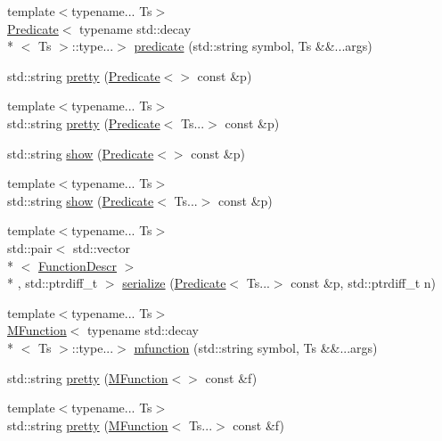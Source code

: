 \begin{DoxyCompactItemize}
\item 
{\footnotesize template$<$typename... Ts$>$ }\\\hyperlink{structpfq_1_1lang_1_1Predicate}{Predicate}$<$ typename std\+::decay\\*
$<$ Ts $>$\+::type...$>$ \hyperlink{namespacepfq_1_1lang_aca9adafc436b7f851621b979fa1aaf88}{predicate} (std\+::string symbol, Ts \&\&...args)
\item 
std\+::string \hyperlink{namespacepfq_1_1lang_a5bd21fba49ed1266540c831a9110fec6}{pretty} (\hyperlink{structpfq_1_1lang_1_1Predicate}{Predicate}$<$$>$ const \&p)
\item 
{\footnotesize template$<$typename... Ts$>$ }\\std\+::string \hyperlink{namespacepfq_1_1lang_a9593b1beab5ad5f2845f8ccb4d312fab}{pretty} (\hyperlink{structpfq_1_1lang_1_1Predicate}{Predicate}$<$ Ts...$>$ const \&p)
\item 
std\+::string \hyperlink{namespacepfq_1_1lang_aeb7cd494cccb45ea7a0a400a51811646}{show} (\hyperlink{structpfq_1_1lang_1_1Predicate}{Predicate}$<$$>$ const \&p)
\item 
{\footnotesize template$<$typename... Ts$>$ }\\std\+::string \hyperlink{namespacepfq_1_1lang_a667a4e63478d598e4fb2f73a2d503954}{show} (\hyperlink{structpfq_1_1lang_1_1Predicate}{Predicate}$<$ Ts...$>$ const \&p)
\item 
{\footnotesize template$<$typename... Ts$>$ }\\std\+::pair$<$ std\+::vector\\*
$<$ \hyperlink{structpfq_1_1lang_1_1FunctionDescr}{Function\+Descr} $>$\\*
, std\+::ptrdiff\+\_\+t $>$ \hyperlink{namespacepfq_1_1lang_a2e348096a954026da9afbc9cccb1782a}{serialize} (\hyperlink{structpfq_1_1lang_1_1Predicate}{Predicate}$<$ Ts...$>$ const \&p, std\+::ptrdiff\+\_\+t n)
\item 
{\footnotesize template$<$typename... Ts$>$ }\\\hyperlink{structpfq_1_1lang_1_1MFunction}{M\+Function}$<$ typename std\+::decay\\*
$<$ Ts $>$\+::type...$>$ \hyperlink{namespacepfq_1_1lang_a1aacba4a159b6c2ddf275bd1fec19ec2}{mfunction} (std\+::string symbol, Ts \&\&...args)
\item 
std\+::string \hyperlink{namespacepfq_1_1lang_aeb67f2e11da733cb62df2088aac4b5ad}{pretty} (\hyperlink{structpfq_1_1lang_1_1MFunction}{M\+Function}$<$$>$ const \&f)
\item 
{\footnotesize template$<$typename... Ts$>$ }\\std\+::string \hyperlink{namespacepfq_1_1lang_ab957d84cf5881683cde64e2080d54d87}{pretty} (\hyperlink{structpfq_1_1lang_1_1MFunction}{M\+Function}$<$ Ts...$>$ const \&f)
$$
\end{DoxyCompactItemize}
